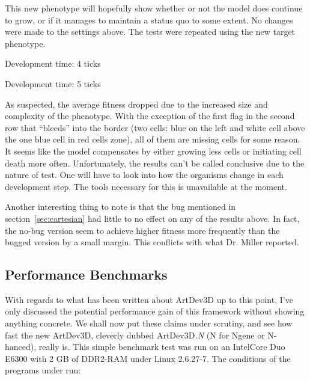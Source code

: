 This new phenotype will hopefully show whether or not the model does continue to grow, or if it manages to maintain a status quo to some extent. No changes were made to the settings above. The tests were repeated using the new target phenotype.

\begin{center}
	Development time: 4 ticks\newline
	~
\end{center}

\begin{center}
	Development time: 5 ticks\newline
	~
	~
\end{center}

As suspected, the average fitness dropped due to the increased size and complexity of the phenotype. With the exception of the first flag in the second row that ``bleeds'' into the border (two cells: blue on the left and white cell above the one blue cell in red cells zone), all of them are missing cells for some reason. It seems like the model compensates by either growing less cells or initiating cell death more often. Unfortunately, the results can't be called conclusive due to the nature of test. One will have to look into how the organisms change in each development step. The tools necessary for this is unavailable at the moment.

Another interesting thing to note is that the bug mentioned in section~\ref{sec:cartesian} had little to no effect on any of the results above. In fact, the no-bug version seem to achieve higher fitness more frequently than the bugged version by a small margin. This conflicts with what Dr. Miller reported.


\subsection{Performance Benchmarks}
With regards to what has been written about ArtDev3D up to this point, I've only discussed the potential performance gain of this framework without showing anything concrete. We shall now put these claims under scrutiny, and see how fast the new ArtDev3D, cleverly dubbed ArtDev3D\emph{.N} (N for Ngene or N-hanced), really is. This simple benchmark test was run on an Intel\textregistered Core Duo E6300 with 2 GB of DDR2-RAM under Linux 2.6.27-7. The conditions of the programs under run:

